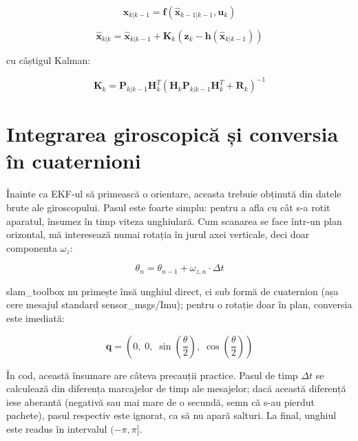 \documentclass[a4paper,12pt,twoside,openany]{report}
\renewcommand{\texttt}[1]{\textnormal{#1}}
\begin{document}
\begin{equation}\label{eq:ekf-predict}
    \hat{\mathbf{x}}_{k|k-1} = \mathbf{f}(\hat{\mathbf{x}}_{k-1|k-1}, \mathbf{u}_k)
\end{equation}

\begin{equation}\label{eq:ekf-update}
    \hat{\mathbf{x}}_{k|k} = \hat{\mathbf{x}}_{k|k-1}
        + \mathbf{K}_k \left(\mathbf{z}_k - \mathbf{h}(\hat{\mathbf{x}}_{k|k-1})\right)
\end{equation}

\noindent cu câștigul Kalman:

\begin{equation}\label{eq:kalman-gain}
    \mathbf{K}_k = \mathbf{P}_{k|k-1} \mathbf{H}_k^T
        \left(\mathbf{H}_k \mathbf{P}_{k|k-1} \mathbf{H}_k^T + \mathbf{R}_k\right)^{-1}
\end{equation}

\section{Integrarea giroscopică și conversia în cuaternioni}
\label{sec:giro}

Înainte ca EKF-ul să primească o orientare, aceasta trebuie obținută din
datele brute ale giroscopului. Pasul este foarte simplu: pentru a afla cu cât
s-a rotit aparatul, însumez în timp viteza unghiulară. Cum scanarea se face
într-un plan orizontal, mă interesează numai rotația în jurul axei verticale,
deci doar componenta $\omega_z$:

\begin{equation}\label{eq:yaw-integrate}
    \theta_n = \theta_{n-1} + \omega_{z,n} \cdot \Delta t
\end{equation}

slam\_toolbox nu primește însă unghiul direct, ci sub formă de cuaternion
(așa cere mesajul standard \texttt{sensor\_msgs/Imu}); pentru o rotație doar
în plan, conversia este imediată:

\begin{equation}\label{eq:yaw-to-quat}
    \mathbf{q} = \left( 0,\; 0,\; \sin\left(\frac{\theta}{2}\right),\; \cos\left(\frac{\theta}{2}\right) \right)
\end{equation}

În cod, această însumare are câteva precauții practice. Pasul de timp
$\Delta t$ se calculează din diferența marcajelor de timp ale mesajelor; dacă
această diferență iese aberantă (negativă sau mai mare de o secundă, semn că
s-au pierdut pachete), pasul respectiv este ignorat, ca să nu apară salturi.
La final, unghiul este readus în intervalul $(-\pi, \pi]$.
\end{document}
